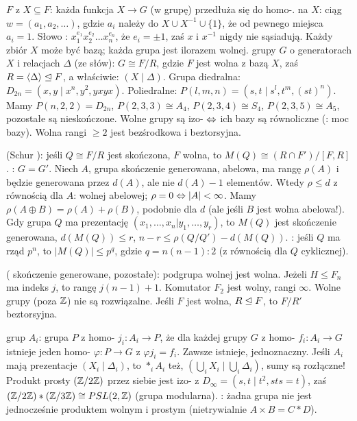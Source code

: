   $F$ z  $X \subseteq F$: każda funkcja $X \to G$ (w grupę) przedłuża się do homo-.
 na $X$: ciąg $w = (a_1, a_2, \ldots)$, gdzie $a_i$ należy do $X \cup X^{-1} \cup \{1\}$, że od pewnego miejsca $a_i = 1$.
Słowo : $x_1^{e_1} x_2^{e_2} \ldots x_n^{e_n}$, że $e_i = \pm 1$, zaś $x$ i $x^{-1}$ nigdy nie sąsiadują.
Każdy zbiór $X$ może być bazą; każda grupa jest ilorazem wolnej.
 grupy $G$ o generatorach $X$ i relacjach $\Delta$ (ze słów): $G \cong F / R$, gdzie $F$ jest wolna z bazą $X$, zaś $R = \langle \Delta \rangle \trianglelefteq F$, a właściwie: $(X \mid \Delta)$.
Grupa diedralna: $D_{2n} = (x, y \mid x^n, y^2, yxyx)$.
Poliedralne: $P(l,m,n) = (s,t \mid s^l, t^m, (st)^n)$.
Mamy $P(n,2,2) = D_{2n}$, $P(2,3,3) \cong A_4$, $P(2,3,4) \cong S_4$, $P(2,3,5) \cong A_5$, pozostałe są nieskończone.
Wolne grupy są izo- $\Leftrightarrow$ ich bazy są równoliczne (: moc bazy).
Wolna rangi $\ge 2$ jest bezśrodkowa i beztorsyjna.

   (Schur ): jeśli $Q \cong F/R$ jest skończona, $F$ wolna, to $M(Q) \cong (R \cap F') / [F, R]$.
: $G = G'$.
Niech $A$, grupa skończenie generowana, abelowa, ma rangę $\rho(A)$ i będzie generowana przez $d(A)$, ale nie $d(A) - 1$ elementów.
Wtedy $\rho \le d$ z równością dla $A$: wolnej abelowej; $\rho = 0 \Leftrightarrow |A| < \infty$.
Mamy $\rho(A \oplus B) = \rho(A) + \rho(B)$, podobnie dla $d$ (ale jeśli $B$ jest wolna abelowa!).
Gdy grupa $Q$ ma prezentację $(x_1, \ldots, x_n | y_1, \ldots, y_r)$, to $M(Q)$ jest skończenie generowana, $d(M(Q)) \le r$, $n - r \le \rho(Q/Q') - d(M(Q))$.
: jeśli $Q$ ma rząd $p^n$, to $|M(Q)| \le p^q$, gdzie $q = n(n-1) : 2$ (z równością dla $Q$ cyklicznej).

 ( skończenie generowane,  pozostałe): podgrupa wolnej jest wolna.
Jeżeli $H \le F_n$ ma indeks $j$, to rangę $j(n-1) + 1$.
Komutator $F_2$ jest wolny, rangi $\infty$.
Wolne grupy (poza $\mathbb{Z}$) nie są rozwiązalne.
Jeśli $F$ jest wolna, $R \trianglelefteq F$, to $F/R'$ beztorsyjna.

 grup $A_i$: grupa $P$ z homo- $j_i \colon A_i \to P$, że dla każdej grupy $G$ z homo- $f_i \colon A_i \to G$ istnieje jeden homo- $\varphi \colon P \to G$ z $\varphi j_i = f_i$.
Zawsze istnieje, jednoznaczny.
Jeśli $A_i$ mają prezentacje $(X_i \mid \Delta_i)$, to $\ast_i A_i$ też, $(\bigcup_i X_i \mid \bigcup_i \Delta_i)$, sumy są rozłączne!
Produkt prosty $(\mathbb{Z}/2\mathbb{Z})$ przez siebie jest izo- z $D_\infty = (s,t \mid t^2, sts = t)$, zaś $(\mathbb{Z}/2\mathbb{Z}) * (\mathbb{Z}/3\mathbb{Z}) \cong PSL(2, \mathbb{Z})$ (grupa modularna).
: żadna grupa nie jest jednocześnie produktem wolnym i prostym (nietrywialnie $A \times B = C * D$).

